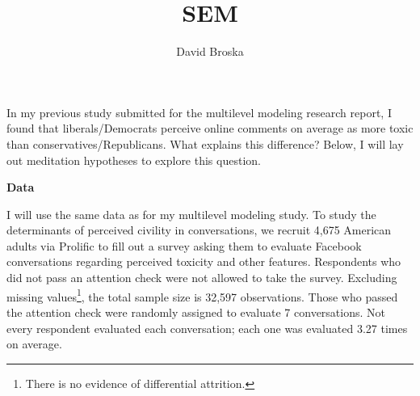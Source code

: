 \documentclass{article}
\title{SEM}
\author[1]{David Broska}
\begin{document}
\maketitle

In my previous study submitted for the multilevel modeling research report, I found that liberals/Democrats perceive online comments on average as more toxic than conservatives/Republicans. What explains this difference? Below, I will lay out meditation hypotheses to explore this question. 



\textbf{Data}

I will use the same data as for my multilevel modeling study. To study the determinants of perceived civility in conversations, we recruit 4,675 American adults via Prolific to fill out a survey asking them to evaluate Facebook conversations regarding perceived toxicity and other features. Respondents who did not pass an attention check were not allowed to take the survey. Excluding missing values\footnote{There is no evidence of differential attrition.}, the total sample size is 32,597 observations. Those who passed the attention check were randomly assigned to evaluate 7 conversations. Not every respondent evaluated each conversation; each one was evaluated 3.27 times on average. 
\end{document}
